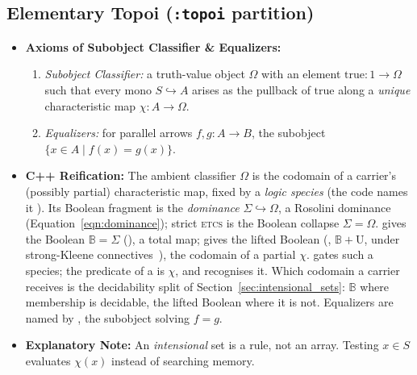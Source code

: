 \documentclass[11pt, a4paper]{article}
\begin{document}
\subsection{Elementary Topoi (\texttt{:topoi} partition)}
\begin{itemize}
    \item \textbf{Axioms of Subobject Classifier \& Equalizers:}
    \begin{enumerate}
        \item \textit{Subobject Classifier:} a truth-value object $\Omega$ with an element $\mathrm{true}: 1 \to \Omega$ such that every mono $S \hookrightarrow A$ arises as the pullback of $\mathrm{true}$ along a \emph{unique} characteristic map $\chi: A \to \Omega$.
        \item \textit{Equalizers:} for parallel arrows $f, g: A \to B$, the subobject $\{x \in A \mid f(x) = g(x)\}$.
    \end{enumerate}
    \item \textbf{C++ Reification:} The ambient classifier $\Omega$ is the codomain of a carrier's (possibly partial) characteristic map, fixed by a \emph{logic species}  (the code names it ). Its Boolean fragment is the \emph{dominance} $\Sigma \hookrightarrow \Omega$, a Rosolini dominance~\cite{rosolini1986continuity} (Equation~\ref{eqn:dominance}); strict \textsc{etcs} is the Boolean collapse $\Sigma = \Omega$.  gives the Boolean $\mathbb{B} = \Sigma$ (), a total map;  gives the lifted Boolean (, $\mathbb{B}+\text{U}$, under strong-Kleene connectives~\cite{kleene1952metamathematics}), the codomain of a partial $\chi$.  gates such a species; the predicate of a  is $\chi$, and  recognises it. Which codomain a carrier receives is the decidability split of Section~\ref{sec:intensional_sets}: $\mathbb{B}$ where membership is decidable, the lifted Boolean where it is not. Equalizers are named by , the subobject solving $f = g$.
    \item \textbf{Explanatory Note:} An \textit{intensional} set is a rule, not an array. Testing $x \in S$ evaluates $\chi(x)$ instead of searching memory.
\end{itemize}
\end{document}
